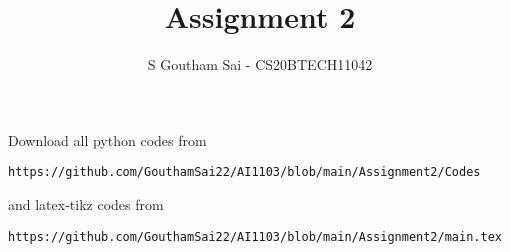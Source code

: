 \documentclass[journal,12pt,twocolumn]{IEEEtran}
\DeclareMathOperator*{\Res}{Res}
\begin{document}
\newcommand{\BEQA}{\begin{eqnarray}}
\newcommand{\EEQA}{\end{eqnarray}}
\newcommand{\define}{\stackrel{\triangle}{=}}

\raggedbottom
\setlength{\parindent}{0pt}
\providecommand{\mbf}{\mathbf}
\providecommand{\pr}[1]{\ensuremath{\Pr\left(#1\right)}}
\providecommand{\qfunc}[1]{\ensuremath{Q\left(#1\right)}}
\providecommand{\sbrak}[1]{\ensuremath{{}\left[#1\right]}}
\providecommand{\lsbrak}[1]{\ensuremath{{}\left[#1\right.}}
\providecommand{\rsbrak}[1]{\ensuremath{{}\left.#1\right]}}
\providecommand{\brak}[1]{\ensuremath{\left(#1\right)}}
\providecommand{\lbrak}[1]{\ensuremath{\left(#1\right.}}
\providecommand{\rbrak}[1]{\ensuremath{\left.#1\right)}}
\providecommand{\cbrak}[1]{\ensuremath{\left\{#1\right\}}}
\providecommand{\lcbrak}[1]{\ensuremath{\left\{#1\right.}}
\providecommand{\rcbrak}[1]{\ensuremath{\left.#1\right\}}}
\theoremstyle{remark}
\newtheorem{rem}{Remark}
\newcommand{\sgn}{\mathop{\mathrm{sgn}}}
\providecommand{\abs}[1]{\vert#1\vert}
\providecommand{\res}[1]{\Res\displaylimits_{#1}} 
\providecommand{\norm}[1]{\lVert#1\rVert}
\providecommand{\mtx}[1]{\mathbf{#1}}
\providecommand{\mean}[1]{E[ #1 ]}
\providecommand{\fourier}{\overset{\mathcal{F}}{ \rightleftharpoons}}
\providecommand{\system}{\overset{\mathcal{H}}{ \longleftrightarrow}}
\newcommand{\solution}{\noindent \textbf{Solution: }}
\newcommand{\cosec}{\,\text{cosec}\,}
\providecommand{\dec}[2]{\ensuremath{\overset{#1}{\underset{#2}{\gtrless}}}}
\newcommand{\myvec}[1]{\ensuremath{\begin{pmatrix}#1\end{pmatrix}}}
\newcommand{\mydet}[1]{\ensuremath{\begin{vmatrix}#1\end{vmatrix}}}
\makeatletter
{}
\makeatother
\let\StandardTheFigure\thefigure
\let\vec\mathbf
\renewcommand{\thefigure}{\theproblem}
\def\putbox#1#2#3{\makebox[0in][l]{\makebox[#1][l]{}\raisebox{\baselineskip}[0in][0in]{\raisebox{#2}[0in][0in]{#3}}}}
     \def\rightbox#1{\makebox[0in][r]{#1}}
     \def\centbox#1{\makebox[0in]{#1}}
     \def\topbox#1{\raisebox{-\baselineskip}[0in][0in]{#1}}
     \def\midbox#1{\raisebox{-0.5\baselineskip}[0in][0in]{#1}}
\vspace{3cm}
\title{Assignment 2}
\author{S Goutham Sai - CS20BTECH11042}
\maketitle
\newpage
\bigskip
\renewcommand{\thefigure}{\theenumi}
\renewcommand{\thetable}{\theenumi}
Download all python codes from 
\begin{lstlisting}
https://github.com/GouthamSai22/AI1103/blob/main/Assignment2/Codes
\end{lstlisting}
%
and latex-tikz codes from 
%
\begin{lstlisting}
https://github.com/GouthamSai22/AI1103/blob/main/Assignment2/main.tex
\end{lstlisting}
\end{document}
